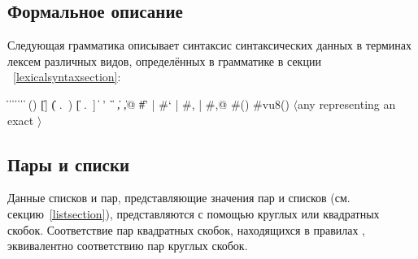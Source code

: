 \subsection{Формальное описание}
\label{datumsyntax}

Следующая грамматика описывает синтаксис синтаксических данных в терминах лексем различных видов,
определённых в грамматике в секции ~\ref{lexicalsyntaxsection}:

{%
\renewcommand{\baselinestretch}{1.05}
\selectfont
\begin{grammar}%
 \: 
\>  \| 
 \:  \| 
\>  \|  \|  \|  
 \: 
 \:  \|  \| 
 \: () \| []
\>    \| ( .\ ) \| [ .\ ]
\>    \| 
 \:  
 \: ' \| ` \| , \| ,@
\>    \| \#' | \#` | \#, | \#,@
 \: \#()
 \: \#vu8()
 \: $\langle${\rm any  representing an exact}
 \>\>\quad{}$\rangle$%
\end{grammar}

}

\subsection{Пары и списки}
\label{pairlistsyntax}

Данные списков и пар, представляющие значения пар и списков (см. секцию~\ref{listsection}),
представляются с помощью круглых или квадратных скобок. Соответствие пар квадратных скобок,
находящихся в правилах , эквивалентно соответствию пар круглых
скобок.

